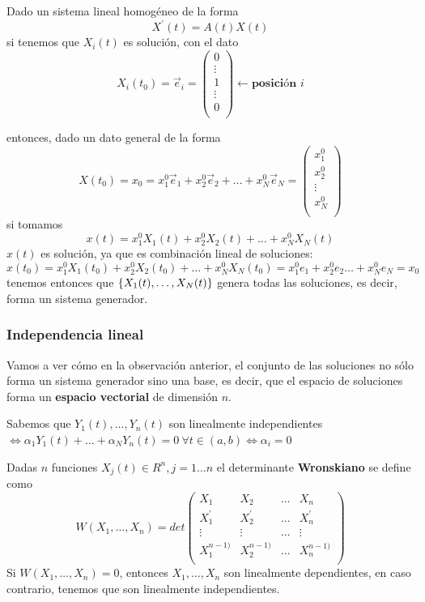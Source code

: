 \documentclass{mathnotes}
\begin{document}
\obs 

Dado un sistema lineal homogéneo de la forma $$X^\prime(t) = A(t)X(t)$$ si tenemos que $X_i(t)$ es solución, con el dato $$X_i(t_0) = \vec{e}_i = \begin{pmatrix}
0\\
\vdots\\
1\\
\vdots\\
0\\
\end{pmatrix} \leftarrow \textbf{posición } i$$

\noindent entonces, dado un dato general de la forma $$X(t_0) = x_0 = x_1^0\vec{e}_1 + x_2^0\vec{e}_2+\hdots+x_N^0\vec{e}_N = \begin{pmatrix}
x_1^0\\
x_2^0\\
\vdots\\
x_N^0\\
\end{pmatrix}$$
si tomamos $$x(t) = x_1^0X_1(t)+x_2^0X_2(t)+\hdots +x_N^0X_N(t)$$ $x(t)$ es solución, ya que es combinación lineal de soluciones:
$$x(t_0) = x_1^0X_1(t_0)+x_2^0X_2(t_0)+\hdots+x_N^0X_N(t_0) = x_1^0e_1+x_2^0e_2\hdots+x_N^0e_N = x_0$$
tenemos entonces que $\{ X_1(t),\hdots,X_N(t) \}$ genera todas las soluciones, es decir, forma un sistema generador.

\subsubsection{Independencia lineal}
Vamos a ver cómo en la observación anterior, el conjunto de las soluciones no sólo forma un sistema generador sino una base, es decir, que el espacio de soluciones forma un \textbf{espacio vectorial} de dimensión $n$.

Sabemos que 
$Y_1(t), \hdots, Y_n(t) $ son linealmente independientes $ \iff \alpha_1Y_1(t)+\hdots+\alpha_NY_n(t) = 0\ \forall t \in (a, b) \iff \alpha_i = 0$

\begin{definition}
Dadas $n$ funciones $X_j(t) \in R^n, j=1\hdots n$ el determinante \textbf{Wronskiano} se define como
$$W(X_1, \hdots, X_n) = det 
\begin{pmatrix}
X_1 & X_2 & \hdots & X_n\\
X^\prime_1& X^\prime_2&\hdots& X^\prime_n\\
\vdots& \vdots& \hdots& \vdots\\
X^{n-1)}_1& X^{n-1)}_2&\hdots& X^{n-1)}_n\\
\end{pmatrix}$$
Si $W(X_1, \hdots, X_n) = 0$, entonces $X_1, \hdots, X_n$ son linealmente dependientes, en caso contrario, tenemos que son linealmente independientes.
\end{definition}
\end{document}
